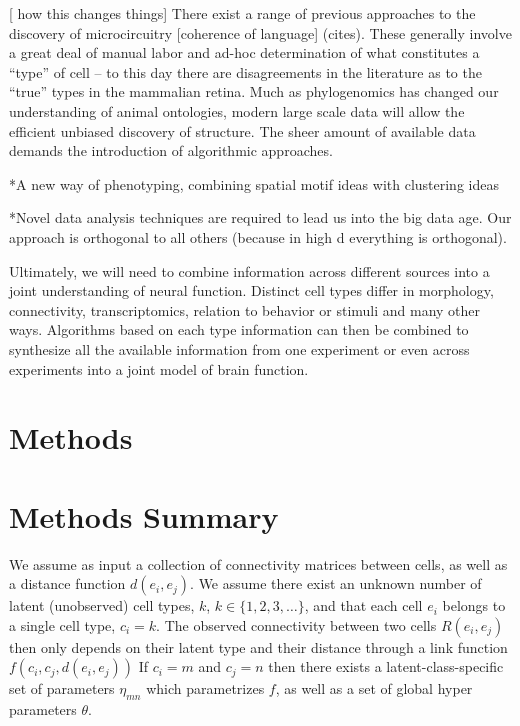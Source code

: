 \documentclass{article}
\begin{document}
[ how this changes things]
There exist a range of previous approaches to the discovery of microcircuitry [coherence of language] (cites). These generally involve a great deal of manual labor and ad-hoc determination of what constitutes a “type” of cell -- to this day there are disagreements in the literature as to the “true” types in the mammalian retina. Much as phylogenomics has changed our understanding of animal ontologies, modern large scale data will allow the efficient unbiased discovery of structure. The sheer amount of available data demands the introduction of algorithmic approaches. 


*A new way of phenotyping, combining spatial motif ideas with clustering ideas

*Novel data analysis techniques are required to lead us into the big data age. Our approach is orthogonal to all others (because in high d everything is orthogonal).

Ultimately, we will need to combine information across different sources into a joint understanding of neural function. Distinct cell types differ in morphology, connectivity, transcriptomics, relation to behavior or stimuli and many other ways. Algorithms based on each type information can then be combined to synthesize all the available information from one experiment or even across experiments into a joint model of brain function.


\section{Methods}
\section{Methods Summary}





We assume as input a collection of connectivity matrices between
cells, as well as a distance function $d(e_i, e_j)$. We assume there
exist an unknown number of latent (unobserved) cell types, $k$, $k \in
\{1, 2, 3, \dots\}$, and that each cell $e_i$ belongs to a single cell
type, $c_i = k$. The observed connectivity between two cells $R(e_i,
e_j)$ then only depends on their latent type and their distance
through a link function $f(c_i, c_j, d(e_i, e_j))$ If $c_i=m$ and
$c_j=n$ then there exists a latent-class-specific set of parameters
$\eta_{mn}$ which parametrizes $f$, as well as a set of global hyper parameters $\theta$. 
\end{document}
